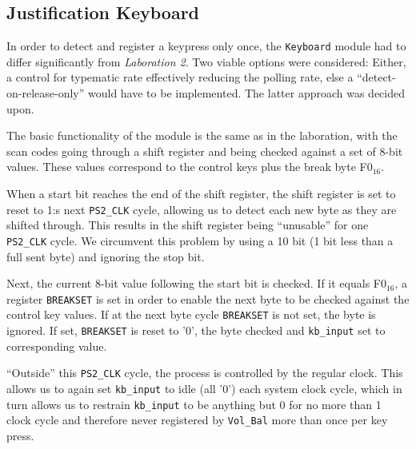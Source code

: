 \subsection{Justification Keyboard}
In order to detect and register a keypress only once, the \verb=Keyboard= module had to differ signific\-antly from \emph{Laboration 2}. Two viable options were considered: Either, a control for typematic rate effectively reducing the polling rate, else a ``detect-on-release-only''  would have to be implemented. The latter approach was decided upon.

The basic functionality of the module is the same as in the laboration, with the scan codes going through a shift register and being checked against a set of 8-bit values. These values correspond to the control keys plus the break byte F0$_{16}$.

When a start bit reaches the end of the shift register, the shift register is set to reset to 1:s next \texttt{PS2\_CLK} cycle, allowing us to detect each new byte as they are shifted through. This results in the shift register being ``unusable'' for one \texttt{PS2\_CLK} cycle. We circumvent this problem by using a 10 bit (1 bit less than a full sent byte) and ignoring the stop bit.

Next, the current 8-bit value following the start bit is checked. If it equals F0$_{16}$, a register \texttt{BREAKSET} is set in order to enable the next byte to be checked against the control key values. If at the next byte cycle \texttt{BREAKSET} is not set, the byte is ignored. If set, \texttt{BREAKSET} is reset to '0', the byte checked and \verb=kb_input= set to corresponding value.

``Outside'' this \texttt{PS2\_CLK} cycle, the process is controlled by the regular clock. This allows us to again set \verb=kb_input= to idle (all '0') each system clock cycle, which in turn allows us to restrain \verb=kb_input= to be anything but 0 for no more than 1 clock cycle and therefore never registered by \verb=Vol_Bal= more than once per key press.
